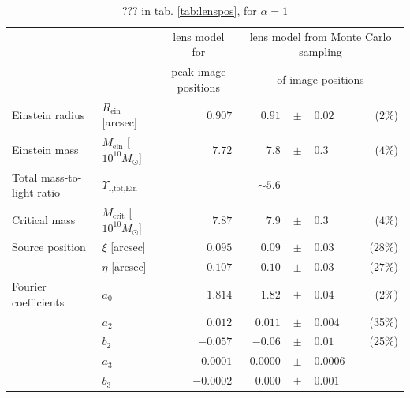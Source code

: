 
\begin{table}
\centering
\caption{??? in tab. \ref{tab:lenspos}, for $\alpha = 1$}
\begin{tabular}{llrrclr}
\hline
 &  & \multicolumn{1}{c}{lens model for} &\multicolumn{4}{c}{lens model from Monte Carlo sampling  } \\
 &  & \multicolumn{1}{c}{peak image positions}  & \multicolumn{4}{c}{of image positions }  \\ \hline
Einstein radius      & $R_\text{ein}$ [arcsec]             & $0.907$ & $0.91$  & $\pm$ & $     0.02$ & ($2\%$)\\
Einstein mass        & $M_\text{ein}$ [$10^{10} M_\odot$]  & $7.72$  & $7.8 $  & $\pm$ & $      0.3$ & ($4\%$) \\
Total mass-to-light ratio & $\Upsilon_\text{I,tot,Ein}$ & & $\sim 5.6$ & & \\
Critical mass        & $M_\text{crit}$ [$10^{10} M_\odot$] & $7.87$  & $7.9$   & $\pm$ & $      0.3$ & ($4\%$)\\
Source position      & $\xi$ [arcsec]                      & $0.095$ & $0.09 $ & $\pm$ & $     0.03$ & ($28\%$)\\
                     & $\eta$ [arcsec]                     & $0.107$ & $0.10 $ & $\pm$ & $     0.03$ & ($27\%$)\\
Fourier coefficients & $a_0$                               & $1.814$ & $1.82 $ & $\pm$ & $   0.04$ & (2\%)\\
                     & $a_2$                               & $0.012$ & $ 0.011 $ & $\pm$ & $    0.004$ & (35\%)\\
                     & $b_2$                               & $-0.057$ & $-0.06 $  & $\pm$ & $  0.01$ & (25\%)\\
                     & $a_3$                               & $-0.0001$& $0.0000 $ & $\pm$ & $   0.0006$ & \\
                     & $b_3$                               & $-0.0002$&$0.000 $   & $\pm$ & $  0.001$ & \\\hline
\end{tabular}  
\label{tab:bestfitlensmodel} 
\end{table}


